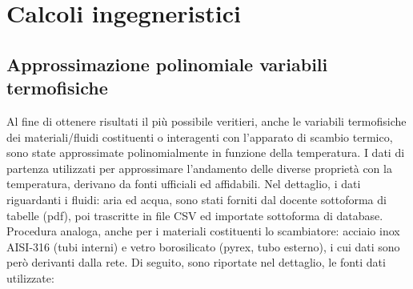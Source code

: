 \documentclass[a4paper,10pt]{article}                                                                                       %
\begin{document}
\section{Calcoli ingegneristici}                                                                                            %
\label{sec:engineering_calcs}                                                                                               %
\subsection{Approssimazione polinomiale variabili termofisiche}                                                             %
\label{subsec:thermovars_polyapprox}                                                                                        %
  Al fine di ottenere risultati il più possibile veritieri, anche le variabili termofisiche dei materiali/fluidi
  costituenti o interagenti con l'apparato di scambio termico, sono state approssimate polinomialmente in funzione della
  temperatura. I dati di partenza utilizzati per approssimare l'andamento delle diverse proprietà con la temperatura,
  derivano da fonti ufficiali ed affidabili. Nel dettaglio, i dati riguardanti i fluidi: aria ed acqua, sono stati forniti
  dal docente sottoforma di tabelle (pdf), poi trascritte in file CSV ed importate sottoforma di database. Procedura
  analoga, anche per i materiali costituenti lo scambiatore: acciaio inox AISI-316 (tubi interni) e vetro borosilicato
  (pyrex, tubo esterno), i cui dati sono però derivanti dalla rete. Di seguito, sono riportate nel dettaglio, le
  fonti dati utilizzate:
\end{document}

